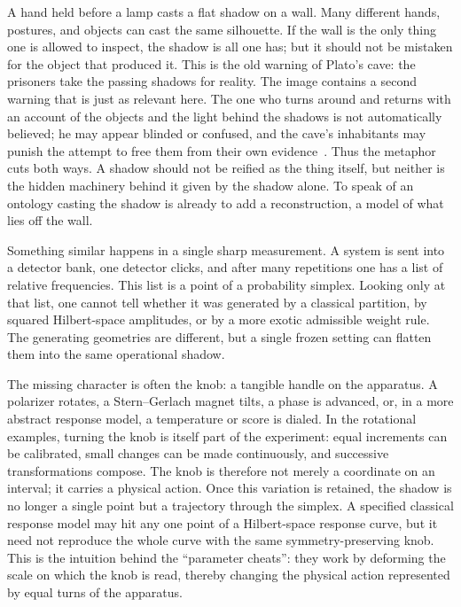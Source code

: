 \documentclass[aps,pra,reprint,superscriptaddress,nofootinbib,floatfix]{revtex4-2}
\begin{document}
A hand held before a lamp casts a flat shadow on a wall.  Many different
hands, postures, and objects can cast the same silhouette.  If the wall is the
only thing one is allowed to inspect, the shadow is all one has; but it should
not be mistaken for the object that produced it.  This is the old warning of
Plato's cave: the prisoners take the passing shadows for reality.  The image
contains a second warning that is just as relevant here.  The one who turns
around and returns with an account of the objects and the light behind the
shadows is not automatically believed; he may appear blinded or confused, and
the cave's inhabitants may punish the attempt to free them from their own
evidence~\cite[Book VII, 514a--517a]{plato-republic}.  Thus the metaphor cuts
both ways.  A shadow should not be reified as the thing itself, but neither is
the hidden machinery behind it given by the shadow alone.  To speak of an
ontology casting the shadow is already to add a reconstruction, a model of
what lies off the wall.

Something similar happens in a single sharp measurement.  A system is sent
into a detector bank, one detector clicks, and after many repetitions one has
a list of relative frequencies.  This list is a point of a probability
simplex.  Looking only at that list, one cannot tell whether it was generated
by a classical partition, by squared Hilbert-space amplitudes, or by a more
exotic admissible weight rule.  The generating geometries are different, but
a single frozen setting can flatten them into the same operational shadow.

The missing character is often the knob: a tangible handle on the apparatus.
A polarizer rotates, a Stern--Gerlach magnet tilts, a phase is advanced, or,
in a more abstract response model, a temperature or score is dialed.  In the
rotational examples, turning the knob is itself part of the experiment: equal
increments can be calibrated, small changes can be made continuously, and
successive transformations compose.  The knob is therefore not merely a
coordinate on an interval; it carries a physical action.  Once this variation
is retained, the shadow is no longer a single point but a trajectory through
the simplex.  A specified classical response model may hit any one point of a
Hilbert-space response curve, but it need not reproduce the whole curve with
the same symmetry-preserving knob.  This is the intuition behind the
``parameter cheats'': they work by deforming the scale on which the knob is
read, thereby changing the physical action represented by equal turns of the
apparatus.
\end{document}

